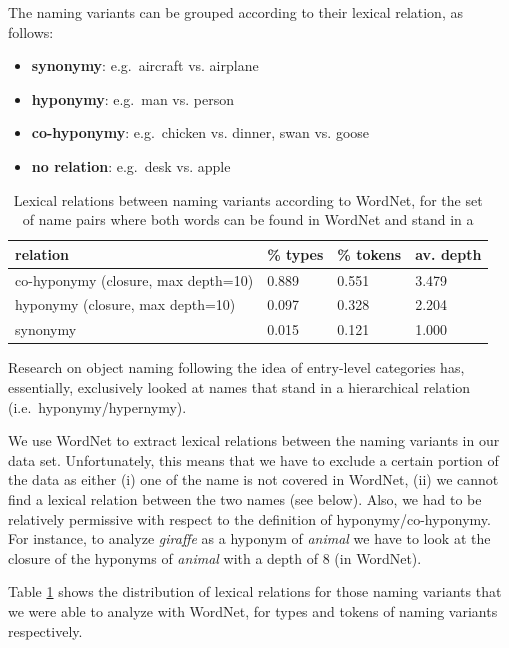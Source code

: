 \documentclass[11pt,a4paper]{article}
\begin{document}
The naming variants can be grouped according to their lexical relation, as follows:

\begin{itemize}
\item \textbf{synonymy}: e.g.\ aircraft vs. airplane 
\item \textbf{hyponymy}: e.g.\ man vs. person
\item \textbf{co-hyponymy}: e.g.\ chicken vs. dinner, swan vs. goose
\item \textbf{no relation}: e.g.\  desk vs. apple
\end{itemize}


\begin{table}
\small
\begin{tabular}{llll}
\toprule
        relation & \% types & \% tokens & av. depth \\
\midrule
 co-hyponymy (closure, max depth=10) &  0.889 &  0.551 &       3.479 \\
    hyponymy (closure, max depth=10) &  0.097 &  0.328 &       2.204 \\
        synonymy &  0.015 &  0.121 &       1.000 \\
\bottomrule
\end{tabular}
\caption{Lexical relations between naming variants according to WordNet, for the set of name pairs where both words can be found in WordNet and stand in a }
\label{tab:rel}
\end{table}


Research on object naming following the idea of entry-level categories has, essentially, exclusively looked at names that stand in a hierarchical relation (i.e.\ hyponymy/hypernymy).

We use WordNet to extract lexical relations between the naming variants in our data set.
Unfortunately, this means that we have to exclude a certain portion of the data as either (i) one of the name is not covered in WordNet, (ii) we cannot find a lexical relation between the two names (see below). Also, we had to be relatively permissive with respect to the definition of hyponymy/co-hyponymy. 
For instance, to analyze \textit{giraffe} as a hyponym of \textit{animal} we have to look at the closure of the hyponyms of \textit{animal} with a depth of 8 (in WordNet).



Table \ref{tab:rel} shows the distribution of lexical relations for those naming variants that we were able to analyze with WordNet, for types and tokens of naming variants respectively. 
\end{document}
